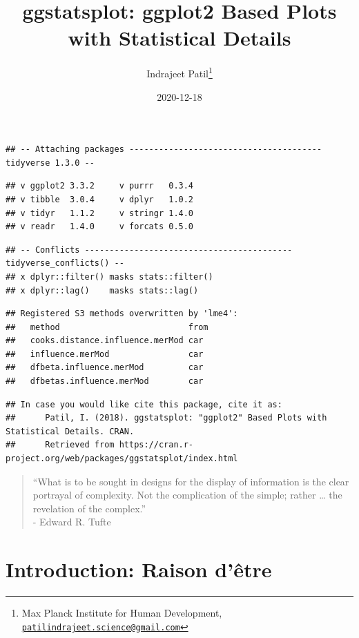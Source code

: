 \documentclass[
]{article}
\title{ggstatsplot: ggplot2 Based Plots with Statistical Details}
\author{Indrajeet Patil\footnote{Max Planck Institute for Human Development, \href{mailto:patilindrajeet.science@gmail.com}{\nolinkurl{patilindrajeet.science@gmail.com}}}}
\date{2020-12-18}
\begin{document}
\maketitle

{
\hypersetup{linkcolor=}
\setcounter{tocdepth}{2}
\tableofcontents
}
\begin{verbatim}
## -- Attaching packages --------------------------------------- tidyverse 1.3.0 --
\end{verbatim}

\begin{verbatim}
## v ggplot2 3.3.2     v purrr   0.3.4
## v tibble  3.0.4     v dplyr   1.0.2
## v tidyr   1.1.2     v stringr 1.4.0
## v readr   1.4.0     v forcats 0.5.0
\end{verbatim}

\begin{verbatim}
## -- Conflicts ------------------------------------------ tidyverse_conflicts() --
## x dplyr::filter() masks stats::filter()
## x dplyr::lag()    masks stats::lag()
\end{verbatim}

\begin{verbatim}
## Registered S3 methods overwritten by 'lme4':
##   method                          from
##   cooks.distance.influence.merMod car 
##   influence.merMod                car 
##   dfbeta.influence.merMod         car 
##   dfbetas.influence.merMod        car
\end{verbatim}

\begin{verbatim}
## In case you would like cite this package, cite it as:
##      Patil, I. (2018). ggstatsplot: "ggplot2" Based Plots with Statistical Details. CRAN.
##      Retrieved from https://cran.r-project.org/web/packages/ggstatsplot/index.html
\end{verbatim}

\begin{quote}
``What is to be sought in designs for the display of information is the clear
portrayal of complexity. Not the complication of the simple; rather \ldots{} the
revelation of the complex.''\\
- Edward R. Tufte
\end{quote}

\hypertarget{introduction-raison-duxeatre}{%
\section{Introduction: Raison d'être}\label{introduction-raison-duxeatre}}
\end{document}

